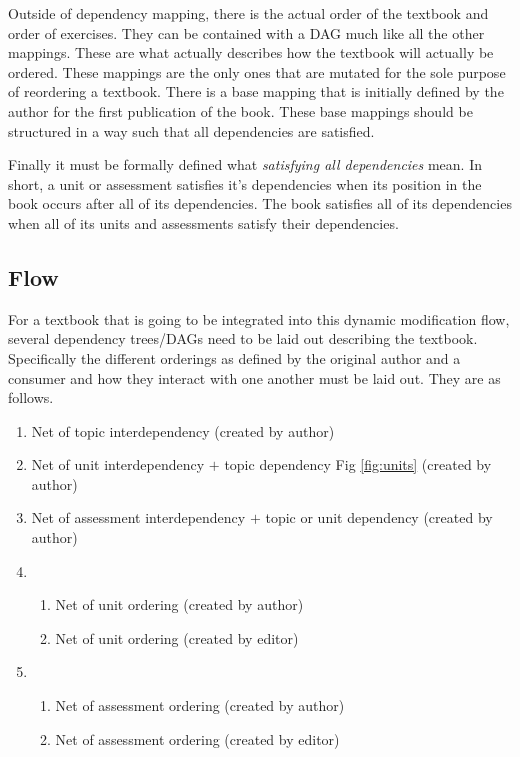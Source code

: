 Outside of dependency mapping, there is the actual order of the textbook and order of exercises. They can be contained with a DAG much like all the other mappings. These are what actually describes how the textbook will actually be ordered. These mappings are the only ones that are mutated for the sole purpose of reordering a textbook. There is a base mapping that is initially defined by the author for the first publication of the book. These base mappings should be structured in a way such that all dependencies are satisfied.

Finally it must be formally defined what \textit{satisfying all dependencies} mean. In short, a unit or assessment satisfies it's dependencies when its position in the book occurs after all of its dependencies. The book satisfies all of its dependencies when all of its units and assessments satisfy their dependencies.

\subsection{Flow}

For a textbook that is going to be integrated into this dynamic modification flow, several dependency trees/DAGs need to be laid out describing the textbook. Specifically the different orderings as defined by the original author and a consumer and how they interact with one another must be laid out. They are as follows.

\begin{enumerate}
    \item Net of topic interdependency (created by author)
    \item Net of unit interdependency $+$ topic dependency Fig \ref{fig:units} (created by author)
    \item Net of assessment interdependency $+$ topic or unit dependency (created by author)
    \item \begin{enumerate}
        \item Net of unit ordering (created by author)
        \item Net of unit ordering (created by editor)
    \end{enumerate}
    \item \begin{enumerate}
        \item Net of assessment ordering (created by author)
        \item Net of assessment ordering (created by editor)
    \end{enumerate}
\end{enumerate}

